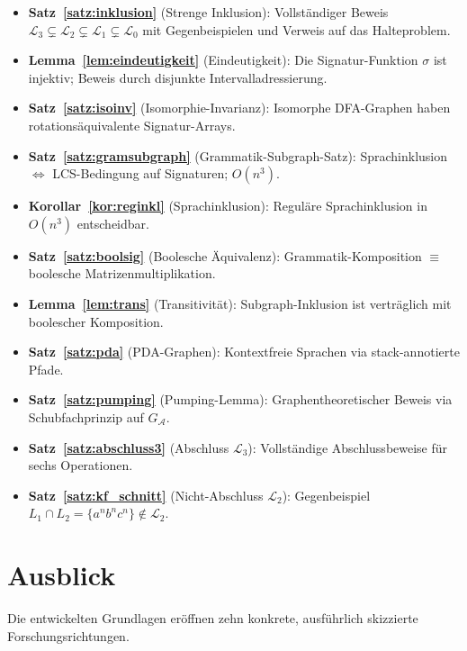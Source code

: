 ﻿\documentclass[a4paper,12pt]{article}
\theoremstyle{definition}
\begin{document}
\begin{itemize}
    \item \textbf{Satz~\ref{satz:inklusion}} (Strenge Inklusion):
          Vollst\"andiger Beweis $\mathcal{L}_3 \subsetneq \mathcal{L}_2 \subsetneq
          \mathcal{L}_1 \subsetneq \mathcal{L}_0$ mit Gegenbeispielen und
          Verweis auf das Halteproblem.
    \item \textbf{Lemma~\ref{lem:eindeutigkeit}} (Eindeutigkeit):
          Die Signatur-Funktion $\sigma$ ist injektiv;
          Beweis durch disjunkte Intervalladressierung.
    \item \textbf{Satz~\ref{satz:isoinv}} (Isomorphie-Invarianz):
          Isomorphe DFA-Graphen haben rotations\"aquivalente Signatur-Arrays.
    \item \textbf{Satz~\ref{satz:gramsubgraph}} (Grammatik-Subgraph-Satz):
          Sprachinklusion $\Leftrightarrow$ LCS-Bedingung auf Signaturen; $O(n^3)$.
    \item \textbf{Korollar~\ref{kor:reginkl}} (Sprachinklusion):
          Regul\"are Sprachinklusion in $O(n^3)$ entscheidbar.
    \item \textbf{Satz~\ref{satz:boolsig}} (Boolesche \"Aquivalenz):
          Grammatik-Komposition $\equiv$ boolesche Matrizenmultiplikation.
    \item \textbf{Lemma~\ref{lem:trans}} (Transitivit\"at):
          Subgraph-Inklusion ist vertr\"aglich mit boolescher Komposition.
    \item \textbf{Satz~\ref{satz:pda}} (PDA-Graphen):
          Kontextfreie Sprachen via stack-annotierte Pfade.
    \item \textbf{Satz~\ref{satz:pumping}} (Pumping-Lemma):
          Graphentheoretischer Beweis via Schubfachprinzip auf $G_{\mathcal{A}}$.
    \item \textbf{Satz~\ref{satz:abschluss3}} (Abschluss $\mathcal{L}_3$):
          Vollst\"andige Abschlussbeweise f\"ur sechs Operationen.
    \item \textbf{Satz~\ref{satz:kf_schnitt}} (Nicht-Abschluss $\mathcal{L}_2$):
          Gegenbeispiel $L_1 \cap L_2 = \{a^n b^n c^n\} \notin \mathcal{L}_2$.
\end{itemize}

\section{Ausblick}

Die entwickelten Grundlagen er\"offnen zehn konkrete, ausf\"uhrlich
skizzierte Forschungsrichtungen.
\end{document}
